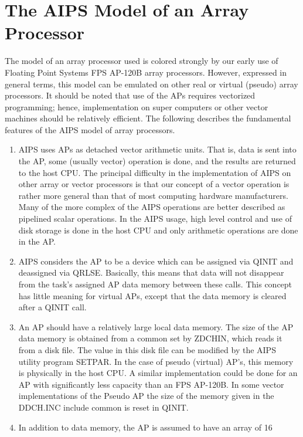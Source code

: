 \section{The AIPS Model of an Array Processor }
The model of an array processor used is colored strongly by our early
use of Floating Point Systems FPS AP-120B array processors. However,
expressed in general terms, this model can be emulated on other real
or virtual (pseudo) array processors.  It should be noted that use of
the APs requires vectorized programming; hence, implementation on
super computers or other vector machines should be relatively
efficient.  The following describes the fundamental features of the
AIPS model of array processors.

\begin{enumerate} %
\item AIPS uses APs as detached vector arithmetic
units.  That is, data is sent into the AP, some (usually vector)
operation is done, and the results are returned to the host CPU.  The
principal difficulty in the implementation of AIPS on other array or
vector processors is that our concept of a vector operation is rather
more general than that of most computing hardware manufacturers. Many
of the more complex of the AIPS operations are better described as
pipelined scalar operations.  In the AIPS usage, high level control
and use of disk storage is done in the host CPU and only arithmetic
operations are done in the AP.
\item AIPS considers the AP to be a device which can be assigned via QINIT
and deassigned via QRLSE.  Basically, this means that data will not
disappear from the task's assigned AP data memory between these
calls.  This concept has little meaning for virtual APs, except that
the data memory is cleared after a QINIT call.
\item An AP should have a relatively large local data memory.  The size of
the AP data memory is obtained from a common set by ZDCHIN, which
reads it from a disk file.  The value in this disk file can be
modified by the AIPS utility program SETPAR.  In the case of pseudo
(virtual) AP's, this memory is physically in the host CPU.  A similar
implementation could be done for an AP with significantly less
capacity than an FPS AP-120B.  In some vector implementations of the
Pseudo AP the size of the memory given in the DDCH.INC include common
is reset in QINIT.
\item In addition to data memory, the AP is assumed to have an array of 16

\end{enumerate}

